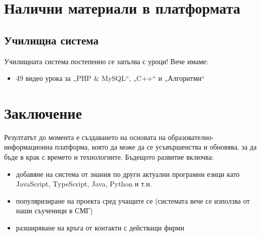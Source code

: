 \documentclass[12pt]{article}
\begin{document}
	\section{Налични материали в платформата}
	\subsection{Училищна система}
	Училищната система постепенно се запълва с уроци! Вече имаме:
	\begin{itemize}
	  \item 49 видео урока за „PHP \& MySQL“, „C++“ и „Алгоритми“
	\end{itemize}
	\section{Заключение}
	Резултатът до момента е създаването на основата на образователно-информационна платформа, която да може да се усъвършенства и обновява, за да бъде в крак с времето и технологиите. 
	Бъдещото развитие включва:
	\begin{itemize}
		\item добавяне на система от знания по други актуални програмни езици като JavaScript, TypeScript, Java, Python и т.н.
		\item популяризиране на проекта сред учащите се (системата вече се използва от наши съученици в СМГ)
		\item разширяване на кръга от контакти с действащи фирми
	\end{itemize}
\end{document}
